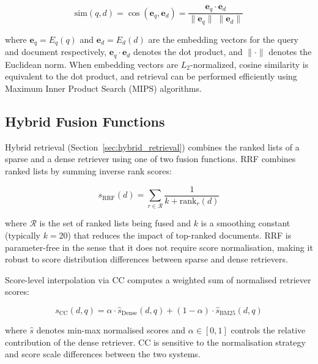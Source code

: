 \begin{equation}
\text{sim}(q, d) = \cos(\mathbf{e}_q, \mathbf{e}_d) = \frac{\mathbf{e}_q \cdot \mathbf{e}_d}{\|\mathbf{e}_q\| \; \|\mathbf{e}_d\|}
\label{eq:cosine}
\end{equation}

\noindent where $\mathbf{e}_q = E_q(q)$ and $\mathbf{e}_d = E_d(d)$ are the embedding vectors for the query and document respectively, $\mathbf{e}_q \cdot \mathbf{e}_d$ denotes the dot product, and $\|\cdot\|$ denotes the Euclidean norm. When embedding vectors are $L_2$-normalized, cosine similarity is equivalent to the dot product, and retrieval can be performed efficiently using Maximum Inner Product Search (MIPS) algorithms.

\subsection{Hybrid Fusion Functions}
\label{sec:hybrid_math}

Hybrid retrieval (Section~\ref{sec:hybrid_retrieval}) combines the ranked lists of a sparse and a dense retriever using one of two fusion functions. RRF \cite{bruch_2023_rrf} combines ranked lists by summing inverse rank scores:

\begin{equation}
    s_{\text{RRF}}(d) = \sum_{r \in \mathcal{R}} \frac{1}{k + \text{rank}_r(d)}
    \label{eq:rrf_ch2}
\end{equation}

\noindent where $\mathcal{R}$ is the set of ranked lists being fused and $k$ is a smoothing constant (typically $k = 20$) that reduces the impact of top-ranked documents. RRF is parameter-free in the sense that it does not require score normalisation, making it robust to score distribution differences between sparse and dense retrievers.

Score-level interpolation via CC computes a weighted sum of normalised retriever scores:

\begin{equation}
    s_{\text{CC}}(d, q) = \alpha \cdot \hat{s}_{\text{Dense}}(d, q) + (1 - \alpha) \cdot \hat{s}_{\text{BM25}}(d, q)
    \label{eq:hybrid_cc_ch2}
\end{equation}

\noindent where $\hat{s}$ denotes min-max normalised scores and $\alpha \in [0, 1]$ controls the relative contribution of the dense retriever. CC is sensitive to the normalisation strategy and score scale differences between the two systems.


